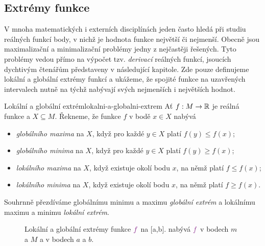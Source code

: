 \subsection{Extrémy funkce}
\label{ssec:extremy-funkce}

V mnoha matematických i externích disciplínách jeden často hledá při studiu
reálných funkcí body, v nichž je hodnota funkce největší či nejmenší. Obecně
jsou maximalizační a minimalizační problémy jedny z nejčastěji řešených. Tyto
problémy vedou přímo na výpočet tzv. \emph{derivací} reálných funkcí, jsoucích
dychtivým čtenářům představeny v následující kapitole. Zde pouze definujeme
lokální a globální extrémy funkcí a ukážeme, že spojité funkce na uzavřených
intervalech nutně na týchž nabývají svých nejmenších i největších hodnot.

\begin{definition}{Lokální a globální extrém}{lokalni-a-globalni-extrem}
 Ať $f:M \to \mathbb{R}$ je reálná funkce a $X \subseteq M$. Řekneme, že funkce $f$ v
 bodě $x \in X$ nabývá
 \begin{itemize}
  \item \emph{globálního maxima} na $X$, když pro každé $y \in X$ platí
   $f(y) \leq f(x)$;
  \item \emph{globálního minima} na $X$, když pro každé $y \in X$ platí $f(y)
   \geq f(x)$;
  \item \emph{lokálního maxima} na $X$, když existuje okolí bodu $x$, na němž
   platí $f \leq f(x)$;
  \item \emph{lokálního minima} na $X$, když existuje okolí bodu $x$, na němž
   platí $f \geq f(x)$.
 \end{itemize}
 Souhrnně přezdíváme globálnímu minimu a maximu \emph{globální extrém} a
 lokálnímu maximu a minimu \emph{lokální extrém}.
\end{definition}

\begin{figure}[ht]
 \centering
 \caption{Lokální a globální extrémy funkce $\clm{f}$ na [a,b].  nabývá $\clm{f}$ v bodech $m$ a $M$ a  v
  bodech $a$ a $b$.}
 \label{fig:extremy}
\end{figure}

